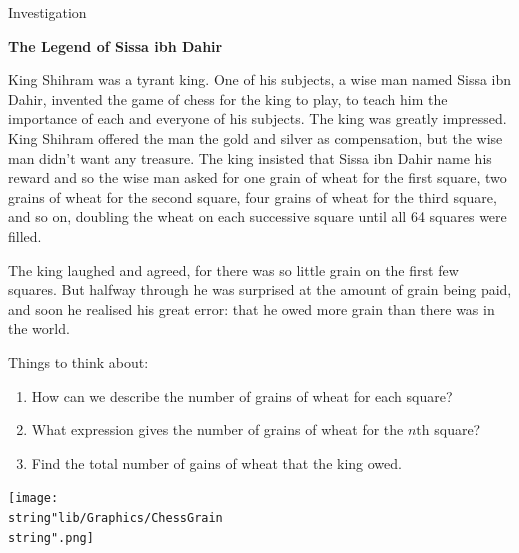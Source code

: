 \documentclass[11pt,a4paper]{book}
\begin{document}
\begin{investigation}[colbacktitle=green]{Investigation}

\hfill \textbf{The Legend of Sissa ibh Dahir}

\bigskip

King Shihram was a tyrant king. One of his subjects, a wise man named
Sissa ibn Dahir, invented the game of chess for the king to play,
to teach him the importance of each and everyone of his subjects.
The king was greatly impressed. King Shihram offered the man the gold
and silver as compensation, but the wise man didn\textquoteright t
want any treasure. The king insisted that Sissa ibn Dahir name his
reward and so the wise man asked for one grain of wheat for the first
square, two grains of wheat for the second square, four grains of
wheat for the third square, and so on, doubling the wheat on each
successive square until all 64 squares were filled.

\medskip{}

The king laughed and agreed, for there was so little grain on the
first few squares. But halfway through he was surprised at the amount
of grain being paid, and soon he realised his great error: that he
owed more grain than there was in the world.

\medskip{}

Things to think about:

\begin{minipage}[t]{0.5\textwidth}

\medskip{}

\begin{enumerate}[label=(\alph*)]

\item  How can we describe the number of grains of wheat for each square?

\item  What expression gives the number of grains of wheat for the $n\text{th}$ square?

\item  Find the total number of gains of wheat that the king owed.

\end{enumerate}

\end{minipage}
\begin{minipage}[t]{0.5\textwidth}
\begin{center}
\texttt{[image: \\string"lib/Graphics/ChessGrain\\string".png]}
\par\end{center}
\end{minipage}

\end{investigation}
\end{document}
